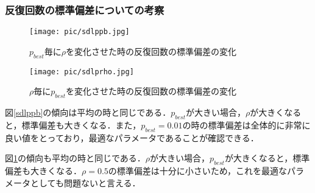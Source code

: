 \documentclass[a4j]{jsarticle}
\begin{document}
\subsubsection{反復回数の標準偏差についての考察}
\begin{figure}[htb]
 \begin{minipage}{0.5\hsize}
  \begin{center}
   \texttt{[image: pic/sdlppb.jpg]}
  \end{center}
  \caption{$p_{best}$毎に$\rho$を変化させた時の反復回数の標準偏差の変化}
  \label{sdlppb}
 \end{minipage}
 \begin{minipage}{0.5\hsize}
  \begin{center}
   \texttt{[image: pic/sdlprho.jpg]}
  \end{center}
  \caption{$\rho$毎に$p_{best}$を変化させた時の反復回数の標準偏差の変化}
  \label{sdlprho}
 \end{minipage}
\end{figure}

図\ref{sdlppb}の傾向は平均の時と同じである．$p_{best}$が大きい場合，$\rho$が大きくなると，標準偏差も大きくなる．また，$p_{best} = 0.01$の時の標準偏差は全体的に非常に良い値をとっており，最適なパラメータであることが確認できる．
\par
図\ref{sdlprho}の傾向も平均の時と同じである．$\rho$が大きい場合，$p_{best}$が大きくなると，標準偏差も大きくなる．$\rho=0.5$の標準偏差は十分に小さいため，これを最適なパラメータとしても問題ないと言える．
\end{document}
